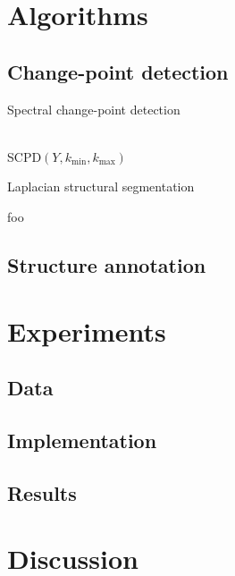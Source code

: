 \documentclass{article}
\begin{document}
\section{Algorithms}

\subsection{Change-point detection}

\begin{algorithm}
\caption{Spectral change-point detection\label{scp}}
\begin{algorithmic}[1]
\\
{\sc SCPD}$(Y, k_\text{min}, k_\text{max})$
        \ENDIF
    \ENDFOR
\end{algorithmic}
\end{algorithm}

\begin{algorithm}
\caption{Laplacian structural segmentation\label{lss}}
\begin{algorithmic}[1]
\STATE foo
\end{algorithmic}
\end{algorithm}

\subsection{Structure annotation}

\section{Experiments}

\subsection{Data}

\subsection{Implementation}

\subsection{Results}

\section{Discussion}


\end{document}
